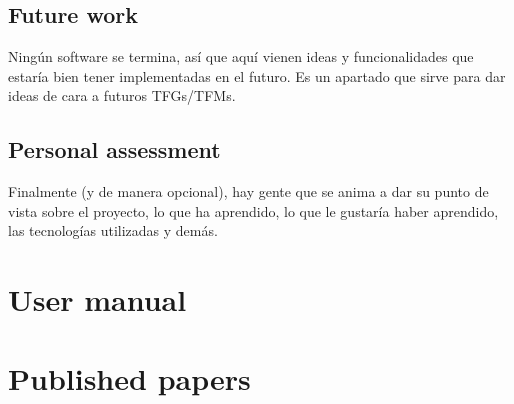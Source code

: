 \documentclass[a4paper, 12pt]{book}
\begin{document}
\section{Future work}
\label{sec:future-work}
Ningún software se termina, así que aquí vienen ideas y funcionalidades
que estaría bien tener implementadas en el futuro.
Es un apartado que sirve para dar ideas de cara a futuros TFGs/TFMs.
\section{Personal assessment}
\label{sec:assessment}
Finalmente (y de manera opcional), hay gente que se anima a dar su punto de
vista sobre el proyecto, lo que ha aprendido, lo que le gustaría haber aprendido,
las tecnologías utilizadas y demás.
\cleardoublepage
\appendix
\chapter{User manual}
\label{app:manual}
\chapter{Published papers}
\label{app:papers}
\cleardoublepage

\end{document}
